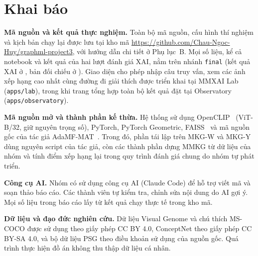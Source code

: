\documentclass[conference]{IEEEtran}
\begin{document}






\section{Khai báo}\label{sec:declare}
\textbf{Mã nguồn và kết quả thực nghiệm.} Toàn bộ mã nguồn, cấu hình thí nghiệm và kịch bản chạy lại được lưu tại kho mã \url{https://github.com/Chau-Ngoc-Huy/graphml-project3}, với hướng dẫn chi tiết ở Phụ lục~B. Mọi số liệu, kể cả notebook và kết quả của hai lượt đánh giá XAI, nằm trên nhánh \texttt{final} (kết quả XAI ở , bản đối chiếu ở ). Giao diện cho phép nhập câu truy vấn, xem các ảnh xếp hạng cao nhất cùng đường đi giải thích được triển khai tại MMXAI Lab (\texttt{apps/lab}), trong khi trang tổng hợp toàn bộ kết quả đặt tại Observatory (\texttt{apps/observatory}).

\textbf{Mã nguồn mở và thành phần kế thừa.} Hệ thống sử dụng OpenCLIP~\cite{openclip} (ViT-B/32, giữ nguyên trọng số), PyTorch, PyTorch Geometric, FAISS~\cite{faiss} và mã nguồn gốc của tác giả AdaMF-MAT~\cite{adamf}. Trong đó, phần tái lập trên MKG-W và MKG-Y dùng nguyên script của tác giả, còn các thành phần dựng MMKG từ dữ liệu của nhóm và tính điểm xếp hạng lại trong quy trình đánh giá chung do nhóm tự phát triển.

\textbf{Công cụ AI.} Nhóm có sử dụng công cụ AI (Claude Code) để hỗ trợ viết mã và soạn thảo báo cáo. Các thành viên tự kiểm tra, chỉnh sửa nội dung do AI gợi ý. Mọi số liệu trong báo cáo lấy từ kết quả chạy thực tế trong kho mã.

\textbf{Dữ liệu và đạo đức nghiên cứu.} Dữ liệu Visual Genome và chú thích MS-COCO được sử dụng theo giấy phép CC BY 4.0, ConceptNet theo giấy phép CC BY-SA 4.0, và bộ dữ liệu PSG theo điều khoản sử dụng của nguồn gốc. Quá trình thực hiện đồ án không thu thập dữ liệu cá nhân.
\end{document}
